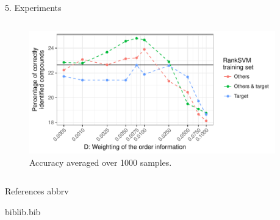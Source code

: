 \documentclass{beamer}
\begin{document}
\begin{frame}{}
\begin{columns}[T]
\begin{column}{.52\linewidth}
\begin{block}       {{\normalsize 5. Experiments}}
\begin{columns}
\begin{column}{.49\linewidth}
\begin{figure}
                    \includegraphics[width=\textwidth]{images/top1_accuracy_reranking_GS_BS_n_rep=1000_no_facet.pdf}
                    \caption{Accuracy averaged over 1000 samples.}
                    \label{fig:top1_acc_for_different_D}
\end{figure}
\end{column}
\begin{column}{.01\linewidth}
\end{column}
\end{columns}                    
\end{block}

\vfill

\begin{block}       {\small References}
  {abbrv}
\vspace{-1.5cm}
\begin{multicols}{2}
\begin{footnotesize}
       {biblib.bib}
\end{footnotesize}
\end{multicols}
\end{block}

\end{column}

\end{columns}

\vfill

\end{frame}
\end{document}
